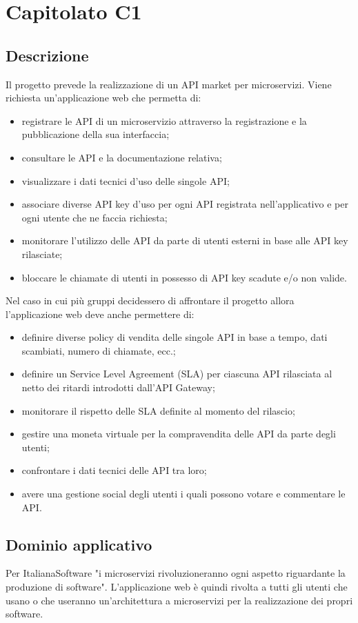 \section {Capitolato C1}
	\subsection {Descrizione}
		Il progetto prevede la realizzazione di un API market per microservizi. Viene richiesta un'applicazione web che permetta di:
		\begin {itemize}
			\item registrare le API di un microservizio attraverso la registrazione e la pubblicazione della sua interfaccia;
			\item consultare le API e la documentazione relativa;
			\item visualizzare i dati tecnici d'uso delle singole API;
			\item associare diverse API key d'uso per ogni API registrata nell'applicativo e per ogni utente che ne faccia richiesta;
			\item monitorare l'utilizzo delle API da parte di utenti esterni in base alle API key rilasciate;
			\item bloccare le chiamate di utenti in possesso di API key scadute e/o non valide.
		\end {itemize}
		Nel caso in cui più gruppi decidessero di affrontare il progetto allora l'applicazione web deve anche permettere di:
		\begin {itemize}
			\item definire diverse policy di vendita delle singole API in base a tempo, dati scambiati, numero di chiamate, ecc.;
			\item definire un Service Level Agreement (SLA) per ciascuna API rilasciata al netto dei ritardi introdotti dall'API Gateway;
			\item monitorare il rispetto delle SLA definite al momento del rilascio;
			\item gestire una moneta virtuale per la compravendita delle API da parte degli utenti;
			\item confrontare i dati tecnici delle API tra loro;
			\item avere una gestione social degli utenti i quali possono votare e commentare le API.
		\end {itemize}
	\subsection {Dominio applicativo} 
		Per ItalianaSoftware "i microservizi rivoluzioneranno ogni aspetto riguardante la produzione di software". L'applicazione web è quindi rivolta a tutti gli utenti che usano o che useranno 
		un'architettura a microservizi per la realizzazione dei propri software.
